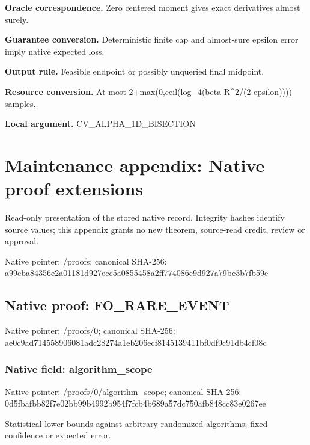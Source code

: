 \documentclass[10pt,a4paper]{article}
\begin{document}
\textbf{Oracle correspondence.} Zero centered moment gives exact derivatives almost surely.



\textbf{Guarantee conversion.} Deterministic finite cap and almost-sure epsilon error imply native expected loss.



\textbf{Output rule.} Feasible endpoint or possibly unqueried final midpoint.



\textbf{Resource conversion.} At most 2+max(0,ceil(log\_4(beta R\textasciicircum{}2/(2 epsilon)))) samples.



\textbf{Local argument.} CV\_ALPHA\_1D\_BISECTION



\section{Maintenance appendix: Native proof extensions}


Read-only presentation of the stored native record. Integrity hashes identify source values; this appendix grants no new theorem, source-read credit, review or approval.



Native pointer: /proofs; canonical SHA-256: a99cba84356e2a01181d927e\allowbreak{}cc5a0855458a2ff774086c9d\allowbreak{}927a79bc3b7fb59e



\subsection{Native proof: FO\_RARE\_EVENT}


Native pointer: /proofs/0; canonical SHA-256: ae0c9ad714558906081adc28\allowbreak{}274a1eb206ecf8145139411b\allowbreak{}f0df9c91db4cf08c



\subsubsection{Native field: algorithm\_scope}


Native pointer: /proofs/0/algorithm\_scope; canonical SHA-256: 0d5fbafbb82f7e02bb99b499\allowbreak{}2b954f7fcb4b689a57dc750a\allowbreak{}fb848cc83e0267ee


Statistical lower bounds against arbitrary randomized algorithms; fixed confidence or expected error.
\end{document}
